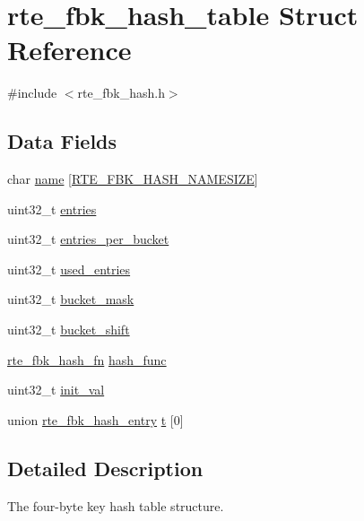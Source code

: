 \hypertarget{structrte__fbk__hash__table}{}\section{rte\+\_\+fbk\+\_\+hash\+\_\+table Struct Reference}
\label{structrte__fbk__hash__table}


{\ttfamily \#include $<$rte\+\_\+fbk\+\_\+hash.\+h$>$}

\subsection*{Data Fields}
\begin{DoxyCompactItemize}
\item 
char \hyperlink{structrte__fbk__hash__table_ac768b4e31109e8a60dc7a326d428f32a}{name} \mbox{[}\hyperlink{rte__fbk__hash_8h_a0a009a5c727b50397611032b08007a16}{R\+T\+E\+\_\+\+F\+B\+K\+\_\+\+H\+A\+S\+H\+\_\+\+N\+A\+M\+E\+S\+I\+Z\+E}\mbox{]}
\item 
uint32\+\_\+t \hyperlink{structrte__fbk__hash__table_a38bad35c844ffd72b0c1132715d5f3a1}{entries}
\item 
uint32\+\_\+t \hyperlink{structrte__fbk__hash__table_af0ce764518ddc03478daa97695cd096e}{entries\+\_\+per\+\_\+bucket}
\item 
uint32\+\_\+t \hyperlink{structrte__fbk__hash__table_aa22453ac46ce8c14513d6bc3f2097f14}{used\+\_\+entries}
\item 
uint32\+\_\+t \hyperlink{structrte__fbk__hash__table_a9b85cb348fede1bed47ae9a0a23af28f}{bucket\+\_\+mask}
\item 
uint32\+\_\+t \hyperlink{structrte__fbk__hash__table_a42f996a6956bb327437519f2d62f17e3}{bucket\+\_\+shift}
\item 
\hyperlink{rte__fbk__hash_8h_ac562ee5335703bbd3caaa4a63748f95f}{rte\+\_\+fbk\+\_\+hash\+\_\+fn} \hyperlink{structrte__fbk__hash__table_a69f0a1b6157a850ab077f407294b0669}{hash\+\_\+func}
\item 
uint32\+\_\+t \hyperlink{structrte__fbk__hash__table_aa9c51f653df7b8a657a31d12ce9a214b}{init\+\_\+val}
\item 
union \hyperlink{unionrte__fbk__hash__entry}{rte\+\_\+fbk\+\_\+hash\+\_\+entry} \hyperlink{structrte__fbk__hash__table_aaa3d527a459f02296bc29530f1c13319}{t} \mbox{[}0\mbox{]}
\end{DoxyCompactItemize}


\subsection{Detailed Description}
The four-\/byte key hash table structure. 

